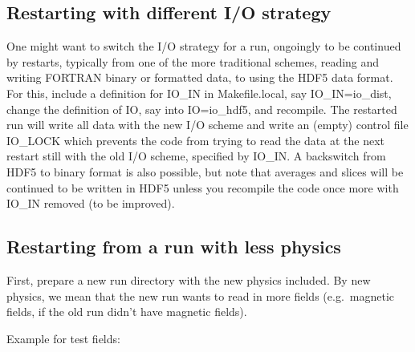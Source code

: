 \documentclass[\mydriver,12pt,twoside,notitlepage,a4paper]{article}
\begin{document}
\subsection{Restarting with different I/O strategy}
\label{RestartinigDiffIOg}
One might want to switch the I/O strategy for a run, ongoingly to be continued
by restarts, typically from one of the more traditional schemes, reading and
writing FORTRAN binary or formatted data, to using the HDF5 data format.
For this, include a definition for IO_IN in Makefile.local, say IO_IN=io_dist,
change the definition of IO, say into IO=io_hdf5, and recompile. The restarted run
will write all data with the new I/O scheme and write an (empty) control file
IO_LOCK which prevents the code from trying to read the data at the next restart
still with the old I/O scheme, specified by IO_IN.
A backswitch from HDF5 to binary format is also possible, but note that averages
and slices will be continued to be written in HDF5 unless you recompile the code
once more with IO_IN removed
(to be improved).


\subsection{Restarting from a run with less physics}
\label{RestartingFromLessPhysics}

First, prepare a new run directory with the new physics included.
By new physics, we mean that the new run wants to read in more fields
(e.g.\ magnetic fields, if the old run didn't have magnetic fields).

Example for test fields:
\end{document}
